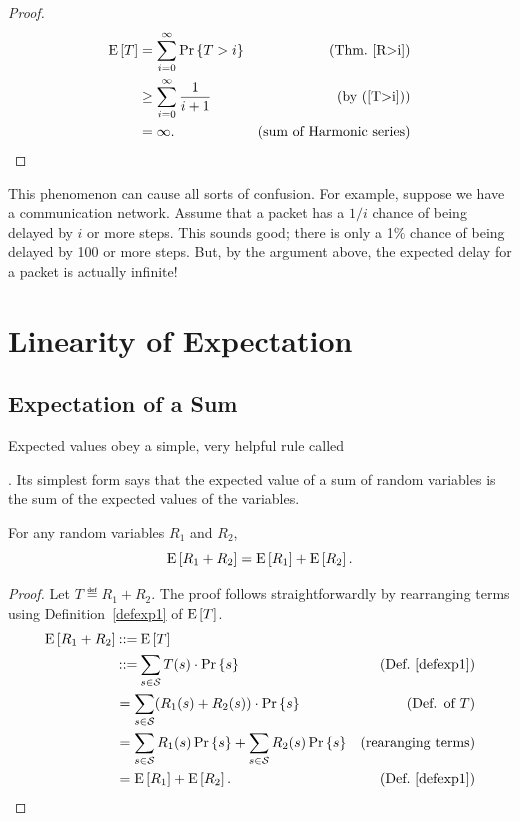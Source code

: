 \documentclass[11pt,twoside]{article}
\begin{document}
\begin{proof}
\begin{align*}
\mathop{\textup{E}}\nolimits\left[T\right] & =  \sum_{i=0}^{\infty} \mathop{\textup{Pr}}\nolimits\left\{T > i\right\} & \text{(Thm.~\ref{R>i})}\\
           & \geq  \sum_{i=0}^{\infty} \frac{1}{i+1} & \text{(by~(\ref{T>i}))}\\
           & =  \infty. & \text{(sum of Harmonic series)}
\end{align*}
\end{proof}

This phenomenon can cause all sorts of confusion.  For example, suppose
we have a communication network.  Assume that a packet has a $1/i$ chance
of being delayed by $i$ or more steps.  This sounds good; there is only a
1\% chance of being delayed by 100 or more steps.  But, by the argument
above, the expected delay for a packet is actually infinite!

\section{Linearity of Expectation}\label{finlin}

\subsection{Expectation of a Sum}

Expected values obey a simple, very helpful rule called
.  Its simplest
form says that the expected value of a sum of random variables is the sum
of the expected values of the variables.

\begin{theorem}\label{expsum-2}
For any random variables $R_1$ and $R_2$,
\[
\mathop{\textup{E}}\nolimits\left[R_1 + R_2\right] = \mathop{\textup{E}}\nolimits\left[R_1\right] + \mathop{\textup{E}}\nolimits\left[R_2\right].
\]
\end{theorem}

\begin{proof}
Let $T \eqdef R_1+R_2$.  The proof follows straightforwardly by
rearranging terms using Definition~\ref{defexp1} of $\mathop{\textup{E}}\nolimits\left[T\right]$.
\begin{align*}
\mathop{\textup{E}}\nolimits\left[R_1 + R_2\right] & \mathbin{::=} \mathop{\textup{E}}\nolimits\left[T\right]\\
        & \mathbin{::=} \sum_{s \in \mathcal{S}} T(s) \cdot \mathop{\textup{Pr}}\nolimits\left\{s\right\}
                       & \text{(Def.~\ref{defexp1})}\\
        & = \sum_{s \in \mathcal{S}} (R_1(s) + R_2(s)) \cdot \mathop{\textup{Pr}}\nolimits\left\{s\right\}
                         & \text{(Def. of $T$)}\\
        & = \sum_{s \in \mathcal{S}} R_1(s) \mathop{\textup{Pr}}\nolimits\left\{s\right\} + 
              \sum_{s \in \mathcal{S}} R_2(s) \mathop{\textup{Pr}}\nolimits\left\{s\right\} & \text{(rearanging terms)}\\
        & = \mathop{\textup{E}}\nolimits\left[R_1\right] + \mathop{\textup{E}}\nolimits\left[R_2\right].  & \text{(Def.~\ref{defexp1})}
\end{align*}
\end{proof}
\end{document}
